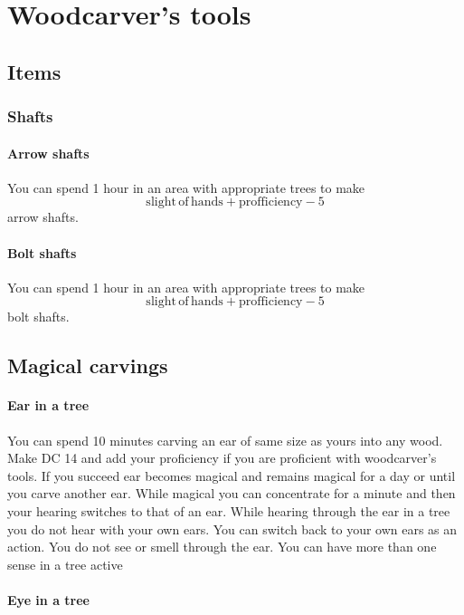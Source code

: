 \chapter{Woodcarver's tools}

\section{Items}

\subsection{Shafts}

\subsubsection{Arrow shafts}

You can spend 1 hour in an area with appropriate trees to make $$\mathrm{slight\,of\,hands} + \mathrm{profficiency} - 5$$ arrow shafts.

\subsubsection{Bolt shafts}

You can spend 1 hour in an area with appropriate trees to make $$\mathrm{slight\,of\,hands} + \mathrm{profficiency} - 5$$ bolt shafts.

\section{Magical carvings}

\subsubsection{Ear in a tree}

You can spend 10 minutes carving an ear of same size as yours into any wood. Make DC 14 \arcana and add your proficiency if you are proficient with woodcarver's tools. If you succeed ear becomes magical and remains magical for a day or until you carve another ear. While magical you can concentrate for a minute and then your hearing switches to that of an ear. While hearing through the ear in a tree you do not hear with your own ears. You can switch back to your own ears as an action. You do not see or smell through the ear. You can have more than one sense in a tree active

\subsubsection{Eye in a tree}

